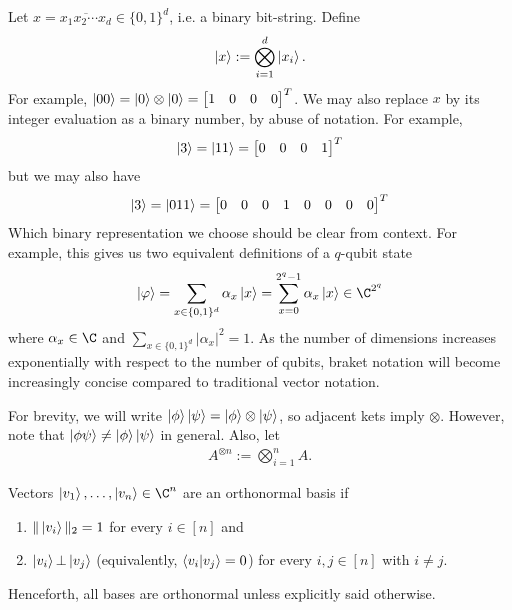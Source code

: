 \begin{definition}
Let $x = \overline{x_1 x_2 \cdots x_d} \in \{0,1\}^d$, i.e. a binary bit-string. Define
\begin{align}
    \ket{x} := \bigotimes_{i=1}^d \ket{x_i}.
\end{align}
For example, $\ket{00} = \ket{0} \otimes \ket{0} = \begin{bmatrix} 1 & 0 & 0 & 0 \end{bmatrix}^T$. We may also replace $x$ by its integer evaluation as a binary number, by abuse of notation. For example,
\begin{align}
    \ket{3} = \ket{11} = \begin{bmatrix}
        0 & 0 & 0 & 1
    \end{bmatrix}^T
\end{align}
but we may also have
\begin{align}
    \ket{3} = \ket{011} = \begin{bmatrix}
        0 & 0 & 0 & 1 & 0 & 0 & 0 & 0
    \end{bmatrix}^T
\end{align}
Which binary representation we choose should be clear from context. For example, this gives us two equivalent definitions of a $q$-qubit state
\begin{align}
    \ket\varphi 
    = \sum_{x \in \{0,1\}^d} \alpha_x \ket{x} 
    = \sum_{x=0}^{2^q - 1} \alpha_x \ket{x} 
    \in \C^{2^q}
\end{align}
where $\alpha_x \in \C$ and $\sum_{x \in \{0,1\}^d} |\alpha_x|^2 = 1$. As the number of dimensions increases exponentially with respect to the number of qubits, braket notation will become increasingly concise compared to traditional vector notation.
\end{definition}

\begin{definition}
For brevity, we will write $\ket\phi \ket\psi = \ket\phi \otimes \ket\psi$, so adjacent kets imply $\otimes$. However, note that $\ket{\phi\psi} \neq \ket\phi \ket\psi$ in general. Also, let 
\begin{align}
    A^{\otimes n} := \bigotimes_{i=1}^n A.
\end{align}
\end{definition}

\begin{definition} Vectors $\ket{v_1}, \ldots, \ket{v_n} \in \C^n$ are an orthonormal basis if
\begin{enumerate}
    \item $\|\ket{v_i}\|_2 = 1$ for every $i \in [n]$ and
    \item $\ket{v_i} \bot \ket{v_j}$ (equivalently, $\braket{v_i}{v_j} = 0$) for every $i,j \in [n]$ with $i \neq j$.
\end{enumerate}
Henceforth, all bases are orthonormal unless explicitly said otherwise.
\end{definition}

